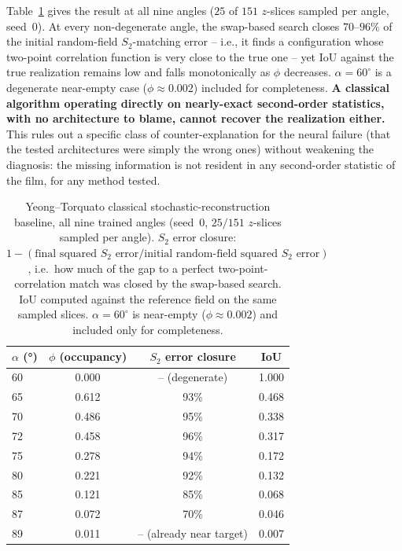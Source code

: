 \documentclass[aip,amsmath,amssymb,reprint]{revtex4-1}
\renewcommand{\ang}{\ensuremath{\alpha}} %
\begin{document}
Table~\ref{tab:yt_baseline} gives the result at all nine angles ($25$ of
$151$ $z$-slices sampled per angle, seed~0). At every non-degenerate angle,
the swap-based search closes $70$--$96\%$ of the initial random-field
$S_2$-matching error -- i.e., it finds a configuration whose two-point
correlation function is very close to the true one -- yet IoU against the
true realization remains low and falls monotonically as $\phi$ decreases.
$\ang=60^{\circ}$ is a degenerate near-empty case ($\phi\!\approx\!0.002$)
included for completeness. \textbf{A classical algorithm operating directly
on nearly-exact second-order statistics, with no architecture to blame,
cannot recover the realization either.} This rules out a specific class of
counter-explanation for the neural failure (that the tested architectures
were simply the wrong ones) without weakening the diagnosis: the missing
information is not resident in any second-order statistic of the film, for
any method tested.

\begin{table}[htbp]
  \centering
  \caption{%
    Yeong--Torquato classical stochastic-reconstruction baseline, all nine
    trained angles (seed~0, $25/151$ $z$-slices sampled per angle).
    $S_2$ error closure: $1 - (\text{final squared } S_2 \text{ error} /
    \text{initial random-field squared } S_2 \text{ error})$, i.e.\ how much
    of the gap to a perfect two-point-correlation match was closed by the
    swap-based search. IoU computed against the reference field on the same
    sampled slices. $\ang=60^{\circ}$ is near-empty
    ($\phi\!\approx\!0.002$) and included only for completeness.
  }
  \label{tab:yt_baseline}
  \begin{tabular}{lccc}
    \toprule
    $\ang$ (°) & $\phi$ (occupancy) & $S_2$ error closure & IoU \\
    \midrule
    60 & 0.000 & --  (degenerate) & 1.000 \\
    65 & 0.612 & 93\% & 0.468 \\
    70 & 0.486 & 95\% & 0.338 \\
    72 & 0.458 & 96\% & 0.317 \\
    75 & 0.278 & 94\% & 0.172 \\
    80 & 0.221 & 92\% & 0.132 \\
    85 & 0.121 & 85\% & 0.068 \\
    87 & 0.072 & 70\% & 0.046 \\
    89 & 0.011 & -- (already near target) & 0.007 \\
    \bottomrule
  \end{tabular}
\end{table}
\end{document}
